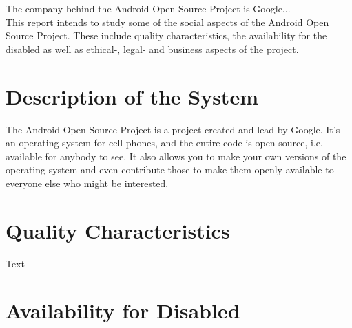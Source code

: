 \documentclass[conference]{IEEEtran}
\begin{document}

The company behind the Android Open Source Project is Google... 
\\
This report intends to study some of the social aspects of the Android Open Source Project. These include quality characteristics, the availability for the disabled as well as ethical-, legal- and business aspects of the project. 


\section{Description of the System}
\label{system}

The Android Open Source Project is a project created and lead by Google. It's an operating system for cell phones, and the entire code is open source, i.e. available for anybody to see. It also allows you to make your own versions of the operating system and even contribute those to make them openly available to everyone else who might be interested.



\section{Quality Characteristics}
\label{quality}

{Text}


\section{Availability for Disabled}
\label{availability}
\end{document}
